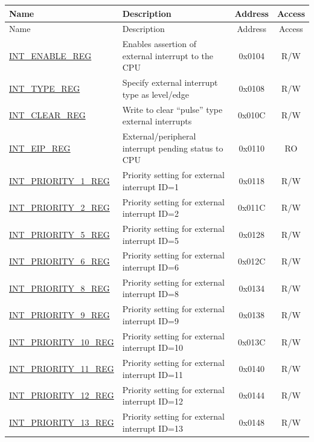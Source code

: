 
\begin{longtable}{ | p{4.0cm} | p{8.4cm} | c | c| }
\hline\rowcolor{lightgray}
Name & Description & Address & Access \\ \hline
\endfirsthead
\hline
\rowcolor{lightgray}
Name & Description & Address & Access  \\
\hline
\endhead
\endfoot

\hyperref[regdesc:INTENABLEREG] {INT\_ENABLE\_REG} & Enables assertion of external interrupt to the CPU & 0x0104 & R/W \\\hline
\hyperref[regdesc:INTTYPEREG]{INT\_TYPE\_REG} & Specify external interrupt type as level/edge & 0x0108 & R/W \\\hline
\hyperref[regdesc:INTCLEARREG] {INT\_CLEAR\_REG} & Write to clear “pulse” type external interrupts & 0x010C & R/W \\\hline
\hyperref[regdesc:INTEIPREG]{INT\_EIP\_REG} & External/peripheral interrupt pending status to CPU & 0x0110 & RO \\\hline
\hyperref[regdesc:INTPRIORITYREG]{INT\_PRIORITY\_1\_REG} & Priority setting for external interrupt ID=1 & 0x0118 & R/W \\\hline
\hyperref[regdesc:INTPRIORITYREG]{INT\_PRIORITY\_2\_REG} & Priority setting for external interrupt ID=2 & 0x011C & R/W \\\hline
\hyperref[regdesc:INTPRIORITYREG]{INT\_PRIORITY\_5\_REG} & Priority setting for external interrupt ID=5 & 0x0128 & R/W \\\hline
\hyperref[regdesc:INTPRIORITYREG]{INT\_PRIORITY\_6\_REG} & Priority setting for external interrupt ID=6 & 0x012C & R/W \\\hline
\hyperref[regdesc:INTPRIORITYREG]{INT\_PRIORITY\_8\_REG} & Priority setting for external interrupt ID=8 & 0x0134 & R/W \\\hline
\hyperref[regdesc:INTPRIORITYREG]{INT\_PRIORITY\_9\_REG} & Priority setting for external interrupt ID=9 & 0x0138 & R/W \\\hline
\hyperref[regdesc:INTPRIORITYREG]{INT\_PRIORITY\_10\_REG} & Priority setting for external interrupt ID=10 & 0x013C & R/W \\\hline
\hyperref[regdesc:INTPRIORITYREG]{INT\_PRIORITY\_11\_REG} & Priority setting for external interrupt ID=11 & 0x0140 & R/W \\\hline
\hyperref[regdesc:INTPRIORITYREG]{INT\_PRIORITY\_12\_REG} & Priority setting for external interrupt ID=12 & 0x0144 & R/W \\\hline
\hyperref[regdesc:INTPRIORITYREG]{INT\_PRIORITY\_13\_REG} & Priority setting for external interrupt ID=13 & 0x0148 & R/W \\\hline

\end{longtable}
